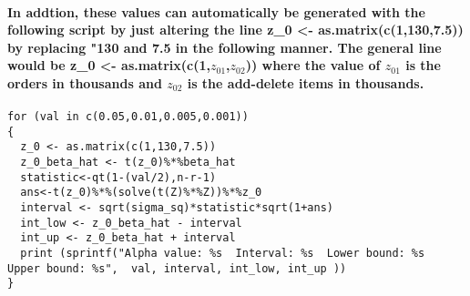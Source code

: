 \documentclass[]{article}
\let\oldparagraph\paragraph
\renewcommand{\paragraph}[1]{\oldparagraph{#1}\mbox{}}
\begin{document}
\hypertarget{in-addtion-these-values-can-automatically-be-generated-with-the-following-script-by-just-altering-the-line-z_0---as.matrixc11307.5-by-replacing-130-and-7.5-in-the-following-manner.-the-general-line-would-be-z_0---as.matrixc1z_01z_02-where-the-value-of-z_01-is-the-orders-in-thousands-and-z_02-is-the-add-delete-items-in-thousands.}{%
\paragraph{\texorpdfstring{In addtion, these values can automatically be
generated with the following script by just altering the line z\_0
\textless{}- as.matrix(c(1,130,7.5)) by replacing "130 and 7.5 in the
following manner. The general line would be z\_0 \textless{}-
as.matrix(c(1,\(z_{01}\),\(z_{02}\))) where the value of \(z_{01}\) is
the orders in thousands and \(z_{02}\) is the add-delete items in
thousands.}{In addtion, these values can automatically be generated with the following script by just altering the line z\_0 \textless{}- as.matrix(c(1,130,7.5)) by replacing "130 and 7.5 in the following manner. The general line would be z\_0 \textless{}- as.matrix(c(1,z\_\{01\},z\_\{02\})) where the value of z\_\{01\} is the orders in thousands and z\_\{02\} is the add-delete items in thousands.}}\label{in-addtion-these-values-can-automatically-be-generated-with-the-following-script-by-just-altering-the-line-z_0---as.matrixc11307.5-by-replacing-130-and-7.5-in-the-following-manner.-the-general-line-would-be-z_0---as.matrixc1z_01z_02-where-the-value-of-z_01-is-the-orders-in-thousands-and-z_02-is-the-add-delete-items-in-thousands.}}

\begin{verbatim}
for (val in c(0.05,0.01,0.005,0.001))
{
  z_0 <- as.matrix(c(1,130,7.5))
  z_0_beta_hat <- t(z_0)%*%beta_hat
  statistic<-qt(1-(val/2),n-r-1)
  ans<-t(z_0)%*%(solve(t(Z)%*%Z))%*%z_0
  interval <- sqrt(sigma_sq)*statistic*sqrt(1+ans)
  int_low <- z_0_beta_hat - interval
  int_up <- z_0_beta_hat + interval
  print (sprintf("Alpha value: %s  Interval: %s  Lower bound: %s  Upper bound: %s",  val, interval, int_low, int_up ))
}
\end{verbatim}
\end{document}
